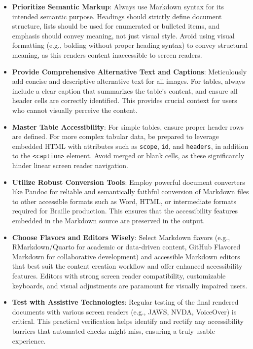 \begin{itemize}[noitemsep,topsep=0pt]
    \item \textbf{Prioritize Semantic Markup}: Always use Markdown syntax for its intended semantic purpose. Headings should strictly define document structure, lists should be used for enumerated or bulleted items, and emphasis should convey meaning, not just visual style. Avoid using visual formatting (e.g., bolding without proper heading syntax) to convey structural meaning, as this renders content inaccessible to screen readers.
    \item \textbf{Provide Comprehensive Alternative Text and Captions}: Meticulously add concise and descriptive alternative text for all images. For tables, always include a clear caption that summarizes the table's content, and ensure all header cells are correctly identified. This provides crucial context for users who cannot visually perceive the content.
    \item \textbf{Master Table Accessibility}: For simple tables, ensure proper header rows are defined. For more complex tabular data, be prepared to leverage embedded HTML with attributes such as \texttt{scope}, \texttt{id}, and \texttt{headers}, in addition to the \texttt{<caption>} element. Avoid merged or blank cells, as these significantly hinder linear screen reader navigation.
    \item \textbf{Utilize Robust Conversion Tools}: Employ powerful document converters like Pandoc for reliable and semantically faithful conversion of Markdown files to other accessible formats such as Word, HTML, or intermediate formats required for Braille production. This ensures that the accessibility features embedded in the Markdown source are preserved in the output.
    \item \textbf{Choose Flavors and Editors Wisely}: Select Markdown flavors (e.g., RMarkdown/Quarto for academic or data-driven content, GitHub Flavored Markdown for collaborative development) and accessible Markdown editors that best suit the content creation workflow and offer enhanced accessibility features. Editors with strong screen reader compatibility, customizable keyboards, and visual adjustments are paramount for visually impaired users.
    \item \textbf{Test with Assistive Technologies}: Regular testing of the final rendered documents with various screen readers (e.g., JAWS, NVDA, VoiceOver) is critical. This practical verification helps identify and rectify any accessibility barriers that automated checks might miss, ensuring a truly usable experience.

\end{itemize}
